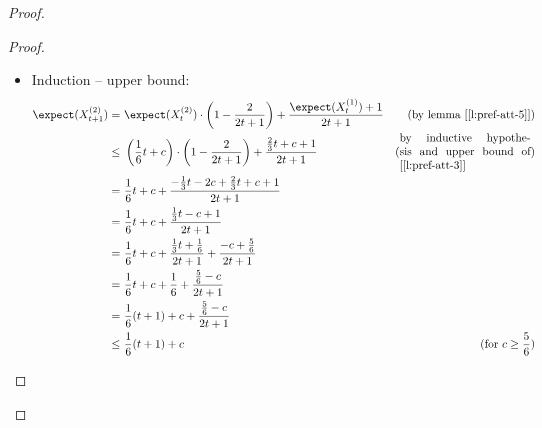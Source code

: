 \begin{proof}
\begin{proof}
\begin{itemize}
            \item Induction -- upper bound:
                \begin{align*}
                    \expect(X_{t + 1}^{(2)}) =&\ \expect(X_t^{(2)}) \cdot \left( 1 - \frac{2}{2t + 1} \right) + \frac{\expect(X_t^{(1)}) + 1}{2t + 1} & \text{(by lemma [\ref{l:pref-att-5}])} \\
                    \leq&\ \left( \frac{1}{6} t + c \right) \cdot \left( 1 - \frac{2}{2t + 1} \right) + \frac{\frac{2}{3}t + c + 1}{2t + 1} &
                    \text{(\parbox{\textwidth/3}{by inductive hypothesis and upper bound of [\ref{l:pref-att-3}]})} \\
                       =&\ \frac{1}{6} t + c + \frac{-\frac{1}{3} t - 2c + \frac{2}{3} t + c + 1}{2t + 1}                                   & \\
                       =&\ \frac{1}{6} t + c + \frac{ \frac{1}{3} t - c + 1}{2t + 1}                                                        & \\
                       =&\ \frac{1}{6} t + c + \frac{ \frac{1}{3} t + \frac{1}{6}}{2t + 1} + \frac{ - c + \frac{5}{6}}{2t + 1}              & \\
                       =&\ \frac{1}{6} t + c + \frac{1}{6} + \frac{ \frac{5}{6} - c}{2t + 1}                                                & \\
                       =&\ \frac{1}{6} (t + 1) + c + \frac{ \frac{5}{6} - c}{2t + 1}                                                        & \\
                    \leq&\ \frac{1}{6} (t + 1) + c                                                                                          & \text{(for $c \geq \frac{5}{6}$)}
                \end{align*}


\end{itemize}
\end{proof}
\end{proof}
